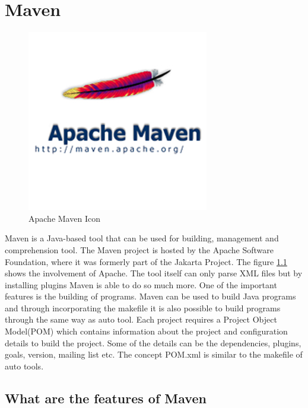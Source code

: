 \chapter{Maven}
\author{Jeroen van Leur}

\begin{figure}
 \vspace{-20pt}
  \begin{centering}
  \includegraphics[scale=0.5]{apache-maven.jpg}
  \end{centering}
  \vspace{-40pt}
  \caption{Apache Maven Icon\protect\footnotemark}
  \label{fig:maven1}
\end{figure}

Maven is a Java-based tool that can be used for building, management and comprehension tool. The Maven project is hosted by the Apache Software Foundation, where it was formerly part of the Jakarta Project. The figure \ref{fig:maven1} shows the involvement of Apache. The tool itself can only parse XML files but by installing plugins Maven is able to do so much more. One of the important features is the building of programs. Maven can be used to build Java programs and through incorporating the makefile it is also possible to build programs through the same way as auto tool. Each project requires a Project Object Model(POM) which contains information about the project and configuration details to build the project. Some of the details can be the dependencies, plugins, goals, version, mailing list etc. The concept POM.xml is similar to the makefile of auto tools.

\section{What are the features of Maven}

